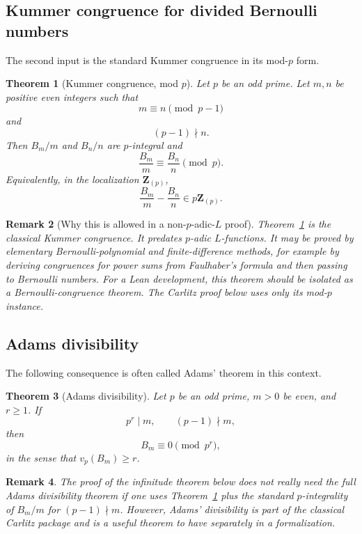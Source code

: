 \documentclass[11pt]{article}
\newtheorem{theorem}{Theorem}[section]
\newtheorem{remark}[theorem]{Remark}
\newcommand{\Z}{\mathbf Z}
\begin{document}
\subsection{Kummer congruence for divided Bernoulli numbers}

The second input is the standard Kummer congruence in its mod-$p$ form.

\begin{theorem}[Kummer congruence, mod $p$]\label{thm:kummer_congruence}
Let $p$ be an odd prime.  Let $m,n$ be positive even integers such that
\[
  m\equiv n \pmod{p-1}
\]
and
\[
  (p-1)\nmid n.
\]
Then $B_m/m$ and $B_n/n$ are $p$-integral and
\[
  \frac{B_m}{m}\equiv \frac{B_n}{n}\pmod p.
\]
Equivalently, in the localization $\Z_{(p)}$,
\[
  \frac{B_m}{m}-\frac{B_n}{n}\in p\Z_{(p)}.
\]
\end{theorem}

\begin{remark}[Why this is allowed in a non-$p$-adic-$L$ proof]
Theorem~\ref{thm:kummer_congruence} is the classical Kummer congruence.  It predates $p$-adic $L$-functions.  It may be proved by elementary Bernoulli-polynomial and finite-difference methods, for example by deriving congruences for power sums from Faulhaber's formula and then passing to Bernoulli numbers.  For a Lean development, this theorem should be isolated as a Bernoulli-congruence theorem.  The Carlitz proof below uses only its mod-$p$ instance.
\end{remark}

\subsection{Adams divisibility}

The following consequence is often called Adams' theorem in this context.

\begin{theorem}[Adams divisibility]\label{thm:adams}
Let $p$ be an odd prime, $m>0$ be even, and $r\ge 1$.  If
\[
  p^r\mid m,
  \qquad
  (p-1)\nmid m,
\]
then
\[
  B_m\equiv 0\pmod{p^r},
\]
in the sense that $v_p(B_m)\ge r$.
\end{theorem}

\begin{remark}
The proof of the infinitude theorem below does not really need the full Adams divisibility theorem if one uses Theorem~\ref{thm:kummer_congruence} plus the standard $p$-integrality of $B_m/m$ for $(p-1)\nmid m$.  However, Adams' divisibility is part of the classical Carlitz package and is a useful theorem to have separately in a formalization.
\end{remark}
\end{document}
